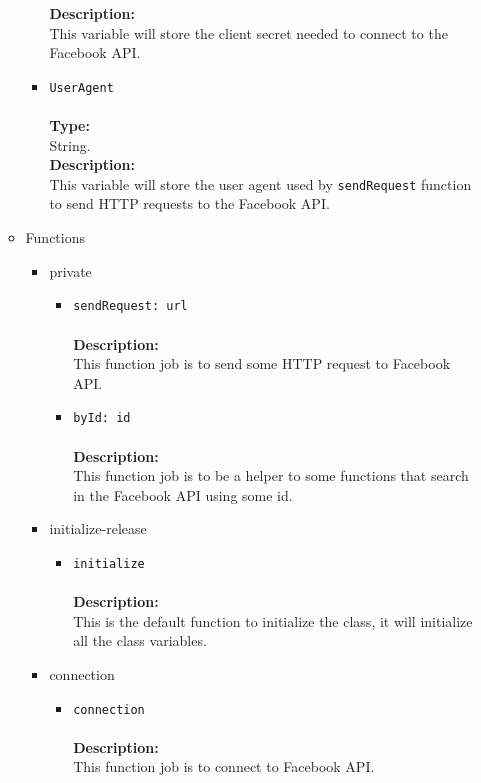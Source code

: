 \begin{itemize}
\begin{itemize}
\begin{itemize}
     \textbf{Description:}\\
     This variable will store the client secret needed to connect to the Facebook API.\\
\item \verb~UserAgent~\\\\
\textbf{Type:}\\
     String.\\

     \textbf{Description:}\\
     This variable will store the user agent used by \verb~sendRequest~ function to send HTTP requests to the Facebook API.
\end{itemize}


\item Functions
\label{sec-1-4-1-2-2}%
\begin{itemize}

\item private
\label{sec-1-4-1-2-2-1}%
\begin{itemize}
\item \verb~sendRequest: url~\\\\
\textbf{Description:}\\
      This function job is to send some HTTP request to Facebook API.\\
\item \verb~byId: id~\\\\
\textbf{Description:}\\
      This function job is to be a helper to some functions that search in the Facebook API using some id.
\end{itemize}


\item initialize-release
\label{sec-1-4-1-2-2-2}%
\begin{itemize}
\item \verb~initialize~\\\\
\textbf{Description:}\\
      This is the default function to initialize the class, it will initialize all the class variables.
\end{itemize}


\item connection
\label{sec-1-4-1-2-2-3}%
\begin{itemize}
\item \verb~connection~\\\\
\textbf{Description:}\\
      This function job is to connect to Facebook API.\\
\end{itemize}



\end{itemize}
\end{itemize}
\end{itemize}
